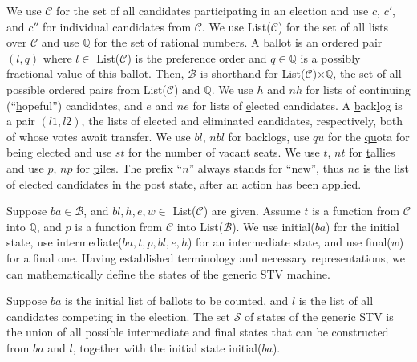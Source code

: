 \documentclass{llncs}
\begin{document}
\noindent
We use
$\mathcal{C}$ 
for the set of all candidates participating in an
election and use $c$, $c'$, and $c''$ for individual candidates from 
$\mathcal{C}$. We use 
\textsf{List}($\mathcal{C}$)
for the set of all lists over
$\mathcal{C}$ and
use 
$\mathbb{Q}$ 
for the set of rational numbers.
A ballot is an ordered pair
$(l,q)$ where 
$l\in$ \textsf{List}($\mathcal{C}$) is the preference order and
$q\in\mathbb{Q}$ is a possibly fractional value of this ballot.
Then,
$\mathcal{B}$ 
is shorthand for 
\textsf{List}($\mathcal{C}$)$\times\mathbb{Q}$,
the set of all possible ordered pairs from 
\textsf{List}($\mathcal{C}$)
and $\mathbb{Q}$.
 We use $h$ and $nh$ for lists
of continuing (``\underline{h}opeful'') candidates, and $e$ and $ne$ for lists of
\underline{e}lected candidates.
A \underline{b}ack\underline{l}og is a
pair $(l1,l2)$, the lists of elected and eliminated
candidates, respectively,
both of whose votes await transfer. 
We use $bl$, $nbl$ for backlogs, use 
$qu$ for the \underline{qu}ota for being
elected and use $st$ for the number of vacant seats. 
We use $t$, $nt$ for \underline{t}allies and use $p$, $np$ for \underline{p}iles.
The prefix ``$n$'' always stands for ``new'', 
thus $\mathit{ne}$ is the list of elected candidates in the post state,
after an action has been applied.

Suppose $ba \in\mathcal{B}$, and $bl , h, e, w \in$
\textsf{List}($\mathcal{C}$) are given. Assume $t$ is a
function from $\mathcal{C}$ into $\mathbb{Q}$, and $p$ is a function
from $\mathcal{C}$ into \textsf{List}($\mathcal{B}$). We use
\textsf{initial}($ba$) for the initial state, use 
\textsf{intermediate}($ba, t, p, bl, e, h$)
for an intermediate state, and use
\textsf{final}($w$) for a final one. 
Having established terminology and necessary
representations, we can mathematically define the states of the
generic STV machine.  

\begin{definition}\label{stv:states}
Suppose $ba$ is the initial list of ballots to be counted, and
$l$ is the list of all candidates competing in the election. 
The set $\mathcal{S}$ of states of the generic STV is the union of
all 
possible intermediate and final states that can be constructed from $ba$ and $l$,
together with the initial state \textsf{initial}($ba$).
\end{definition}
\end{document}
